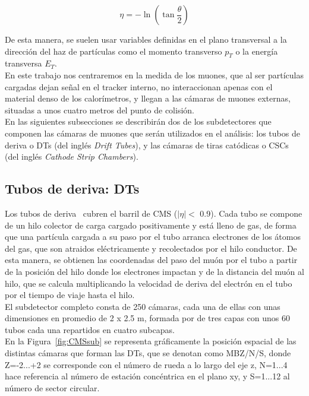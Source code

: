 \begin{equation}
  \eta = -\ln\left(\tan\dfrac{\theta}{2}\right)
\label{eq:eta}
\end{equation}


De esta manera, se suelen usar variables definidas en el plano transversal a la dirección del haz de partículas como el momento transverso $p_{T}$ o la energía transversa $E_{T}$. \\

En este trabajo nos centraremos en la medida de los muones, que al ser part\'iculas cargadas dejan se\~nal en el tracker interno, no interaccionan apenas con el material denso de los calor\'imetros, y llegan a las c\'amaras de muones externas, situadas a unos cuatro metros del punto de colisi\'on. \\
En las siguientes subsecciones se describir\'an dos de los subdetectores que componen las c\'amaras de muones que ser\'an utilizados en el an\'alisis: los tubos de deriva o DTs (del ingl\'es \textit{Drift Tubes}), y las c\'amaras de tiras cat\'odicas o CSCs (del ingl\'es \textit{Cathode Strip Chambers}).

\subsection{Tubos de deriva: DTs}\label{sec:DTs}

Los tubos de deriva~\cite{DTperformance} cubren el barril de CMS ($\lvert \eta \rvert <$ 0.9). Cada tubo se compone de un hilo colector de carga cargado positivamente y est\'a lleno de gas, de forma que una part\'icula cargada a su paso por el tubo arranca electrones de los \'atomos del gas, que son atraidos el\'ectricamente y recolectados por el hilo conductor. De esta manera, se obtienen las coordenadas del paso del mu\'on por el tubo a partir de la posici\'on del hilo donde los electrones impactan y de la distancia del mu\'on al hilo, que se calcula multiplicando la velocidad de deriva del electr\'on en el tubo por el tiempo de viaje hasta el hilo. \\

El subdetector completo consta de 250 c\'amaras, cada una de ellas con unas dimensiones en promedio de 2 x 2.5 m, formada por de tres capas con unos 60 tubos cada una repartidos en cuatro subcapas. \\
En la Figura~\ref{fig:CMSsub} se representa gr\'aficamente la posici\'on espacial de las distintas c\'amaras que forman las DTs, que se denotan como MBZ/N/S, donde Z=-2...+2 se corresponde con el n\'umero de rueda a lo largo del eje z, N=1...4 hace referencia al n\'umero de estaci\'on conc\'entrica en el plano xy, y S=1...12 al n\'umero de sector circular. 


